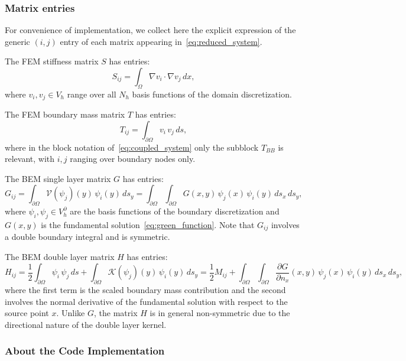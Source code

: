 \documentclass[11pt,onecolumn]{article}
\begin{document}
\subsubsection{Matrix entries}

For convenience of implementation, we collect here the explicit expression of the generic $(i,j)$ entry of each matrix appearing in~\eqref{eq:reduced_system}.

The FEM stiffness matrix $S$ has entries:
\begin{equation}
S_{ij} = \int_{\Omega} \nabla v_i \cdot \nabla v_j \, dx,
\end{equation}
where $v_i, v_j \in V_h$ range over all $N_h$ basis functions of the domain discretization.

The FEM boundary mass matrix $T$ has entries:
\begin{equation}
T_{ij} = \int_{\partial\Omega} v_i\, v_j \, ds,
\end{equation}
where in the block notation of~\eqref{eq:coupled_system} only the subblock $T_{BB}$ is relevant, with $i,j$ ranging over boundary nodes only.

The BEM single layer matrix $G$ has entries:
\begin{equation}
G_{ij} = \int_{\partial\Omega} \mathcal{V}(\psi_j)(y)\, \psi_i(y) \, ds_y = \int_{\partial\Omega}\int_{\partial\Omega} G(x,y)\, \psi_j(x)\, \psi_i(y) \, ds_x \, ds_y,
\end{equation}
where $\psi_i, \psi_j \in V_h^\partial$ are the basis functions of the boundary discretization and $G(x,y)$ is the fundamental solution~\eqref{eq:green_function}. Note that $G_{ij}$ involves a double boundary integral and is symmetric.

The BEM double layer matrix $H$ has entries:
\begin{equation}
H_{ij} = \frac{1}{2}\int_{\partial\Omega} \psi_i\, \psi_j \, ds + \int_{\partial\Omega} \mathcal{K}(\psi_j)(y)\, \psi_i(y) \, ds_y = \frac{1}{2}M_{ij} + \int_{\partial\Omega}\int_{\partial\Omega} \frac{\partial G}{\partial n_x}(x,y)\, \psi_j(x)\, \psi_i(y) \, ds_x \, ds_y,
\end{equation}
where the first term is the scaled boundary mass contribution and the second involves the normal derivative of the fundamental solution with respect to the source point $x$. Unlike $G$, the matrix $H$ is in general non-symmetric due to the directional nature of the double layer kernel.

\subsubsection{About the Code Implementation}
\end{document}

